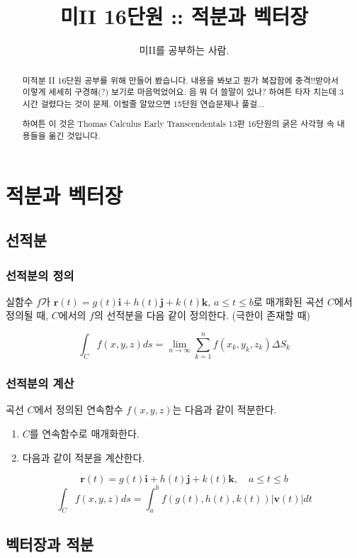 \documentclass[chapter, oneside]{oblivoir}
\title{미II 16단원 :: 적분과 벡터장}
\author{미II를 공부하는 사람. }
\begin{document}
\maketitle
\begin{abstract}
미적분 II 16단원 공부를 위해 만들어 봤습니다. 내용을 봐보고 뭔가 복잡함에 충격!!받아서 이렇게 세세히 구경해(?) 보기로 마음먹었어요. 음 뭐 더 쓸말이 있나? 하여튼 타자 치는데 3시간 걸렸다는 것이 문제. 이럴줄 알았으면 15단원 연습문제나 풀걸...

하여튼 이 것은 Thomas Calculus Early Transcendentals 13판 16단원의 굵은 사각형 속 내용들을 옮긴 것입니다.
\end{abstract}

\newpage
\tableofcontents

\setcounter{chapter}{15}
\chapter{적분과 벡터장  }
\section{선적분 }
\subsection{선적분의 정의 }
실함수 $f$가 $\textbf{r}(t) = g(t)\textbf{i} +h(t) \textbf{j} + k(t)\textbf{k}$, $a \le t \le b$로 매개화된 곡선 $C$에서 정의될 때, $C$에서의 $f$의 선적분을 다음 같이 정의한다.
(극한이 존재할 때)

$$ \int_{C} f(x,y,z) ds = \lim_{n \to \infty} \sum_{k=1}^{n} f(x_k , y_k , z_k ) \Delta S_k $$

\subsection{선적분의 계산 }

곡선 $C$에서 정의된 연속함수 $f(x,y,z)$는 다음과 같이 적분한다.
\begin{enumerate}
\item $C$를 연속함수로 매개화한다. 
\item 다음과 같이 적분을 계산한다.
\end{enumerate}

$$ \textbf{r}(t) = g(t)\textbf{i} +h(t) \textbf{j} + k(t)\textbf{k}, \quad a \le t \le b $$
$$ \int_C f(x,y,z) ds = \int_a^b f(g(t),h(t), k(t)) \left|\textbf{v}(t)\right| dt$$


\section{벡터장과 적분}
\end{document}
